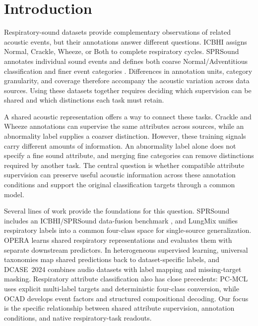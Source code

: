 \section{Introduction}
\label{sec:introduction}
Respiratory-sound datasets provide complementary observations of related
acoustic events, but their annotations answer different questions.
ICBHI assigns Normal, Crackle, Wheeze, or Both to complete respiratory
cycles. SPRSound annotates individual sound events and defines both coarse
Normal/Adventitious classification and finer event categories
\cite{rocha2019icbhi,zhang2022sprsound}. Differences in annotation units,
category granularity, and coverage therefore accompany the acoustic
variation across data sources. Using these datasets together requires deciding
which supervision can be shared and which distinctions each task must retain.

A shared acoustic representation offers a way to connect these tasks.
Crackle and Wheeze annotations can supervise the same attributes across
sources, while an abnormality label supplies a coarser distinction.
However, these training signals carry different amounts of information.
An abnormality label alone does not specify a fine sound attribute, and
merging fine categories can remove distinctions required by another task.
The central question is whether compatible attribute supervision can preserve
useful acoustic information across these annotation conditions and support
the original classification targets through a common model.

Several lines of work provide the foundations for this question.
SPRSound includes an ICBHI/SPRSound data-fusion benchmark
\cite{zhang2022sprsound}, and LungMix unifies respiratory labels into a common
four-class space for single-source generalization\cite{ge2025lungmix}.
OPERA learns shared respiratory representations and evaluates them with
separate downstream predictors\cite{zhang2024opera}.
In heterogeneous supervised learning, universal taxonomies map shared
predictions back to dataset-specific labels\cite{bevandic2022overlapping},
and DCASE~2024 combines audio datasets with label mapping and missing-target
masking\cite{cornell2024dcase}. Respiratory attribute classification also has
close precedents: PC-MCL uses explicit multi-label targets and deterministic
four-class conversion\cite{jeong2026pcmcl}, while OCAD develops event factors
and structured compositional decoding\cite{zhang2026ocad}.
Our focus is the specific relationship between shared attribute supervision,
annotation conditions, and native respiratory-task readouts.

